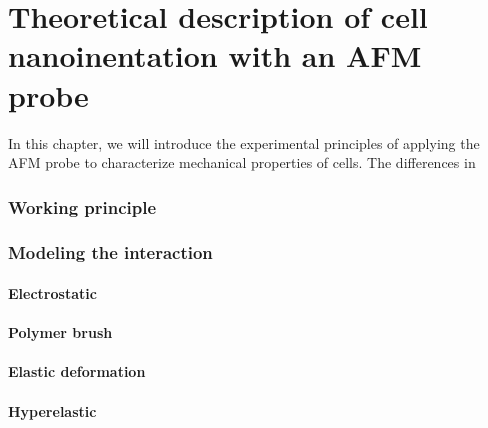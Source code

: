 \part{Theoretical description of cell nanoinentation with an AFM probe}
In this chapter, we will introduce the experimental principles of applying the \gls{AFM} probe to characterize mechanical properties of cells. The differences in  
\section{Working principle}

\section{Modeling the interaction}

\subsection{Electrostatic}

\subsection{Polymer brush}

\subsection{Elastic deformation}

\subsection{Hyperelastic}